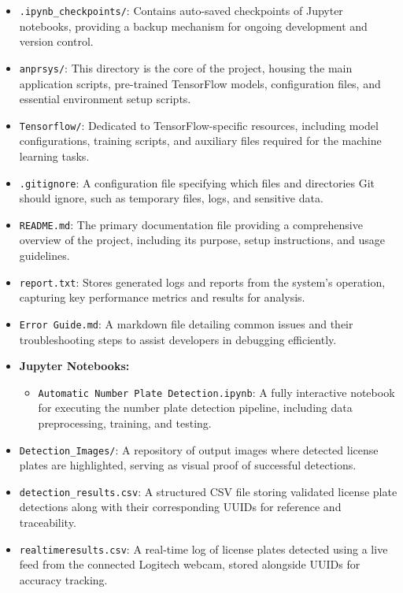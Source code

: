 \begin{itemize}
	\item \texttt{.ipynb\_checkpoints/}: Contains auto-saved checkpoints of Jupyter notebooks, providing a backup mechanism for ongoing development and version control.
	\item \texttt{anprsys/}: This directory is the core of the project, housing the main application scripts, pre-trained TensorFlow models, configuration files, and essential environment setup scripts.
	\item \texttt{Tensorflow/}: Dedicated to TensorFlow-specific resources, including model configurations, training scripts, and auxiliary files required for the machine learning tasks.
	\item \texttt{.gitignore}: A configuration file specifying which files and directories Git should ignore, such as temporary files, logs, and sensitive data.
	\item \texttt{README.md}: The primary documentation file providing a comprehensive overview of the project, including its purpose, setup instructions, and usage guidelines.
	\item \texttt{report.txt}: Stores generated logs and reports from the system's operation, capturing key performance metrics and results for analysis.
	\item \texttt{Error Guide.md}: A markdown file detailing common issues and their troubleshooting steps to assist developers in debugging efficiently.
	\item \textbf{Jupyter Notebooks:}
	\begin{itemize}
		\item \texttt{Automatic Number Plate Detection.ipynb}: A fully interactive notebook for executing the number plate detection pipeline, including data preprocessing, training, and testing.
	\end{itemize}
	\item \texttt{Detection\_Images/}: A repository of output images where detected license plates are highlighted, serving as visual proof of successful detections.
	\item \texttt{detection\_results.csv}: A structured CSV file storing validated license plate detections along with their corresponding UUIDs for reference and traceability.
	\item \texttt{realtimeresults.csv}: A real-time log of license plates detected using a live feed from the connected Logitech webcam, stored alongside UUIDs for accuracy tracking.
\end{itemize}

